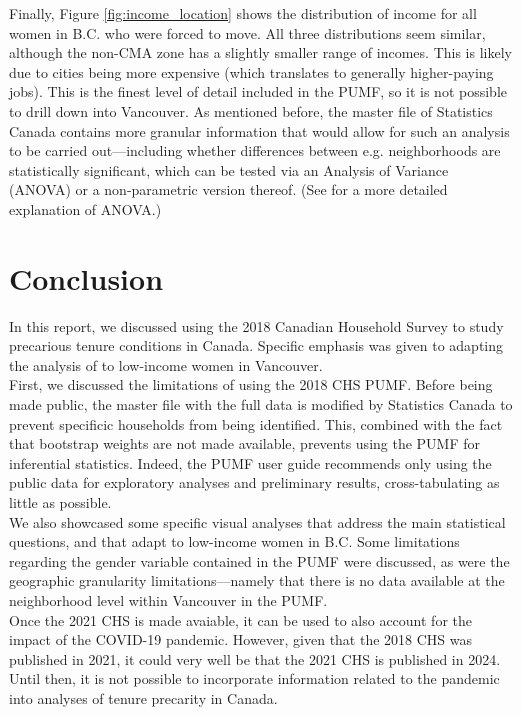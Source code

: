 \documentclass[11pt]{article}
\begin{document}
Finally, Figure \ref{fig:income_location} shows the distribution of income
for all women in B.C. who were forced to move. All three distributions seem
similar, although the non-CMA zone has a slightly smaller range of incomes.
This is likely due to cities being more expensive (which translates to
generally higher-paying jobs). This is the finest level of detail included
in the PUMF, so it is not possible to drill down into Vancouver. As mentioned
before, the master file of Statistics Canada contains more granular information
that would allow for such an analysis to be carried out---including whether
differences between e.g. neighborhoods are statistically significant, which
can be tested via an Analysis of Variance (ANOVA) or a non-parametric
version thereof.
(See \cite[Ch.~14]{agresti} for a more detailed explanation of ANOVA.)



\section{Conclusion} \label{sec:conclusion}


In this report, we discussed using the 2018 Canadian Household Survey
to study precarious tenure conditions in Canada. Specific emphasis
was given to adapting the analysis of \cite{blog} to low-income women
in Vancouver.
\\

First, we discussed the limitations of using the 2018 CHS PUMF.
Before being made public, the master file with the full data
is modified by Statistics Canada to prevent specificic households
from being identified.
This, combined with the fact that bootstrap weights are not made
available, prevents using the PUMF for inferential statistics.
Indeed, the PUMF user guide recommends only using the public data
for exploratory analyses and preliminary results, cross-tabulating
as little as possible.
\\

We also showcased some specific visual analyses that address the main
statistical questions, and that adapt \cite{blog} to low-income women
in B.C. Some limitations regarding the gender variable contained in the
PUMF were discussed, as were the geographic granularity limitations---namely
that there is no data available at the neighborhood level within Vancouver in
the PUMF.
\\

Once the 2021 CHS is made avaiable, it can be used to also account for
the impact of the COVID-19 pandemic. However, given that the 2018 CHS
was published in 2021, it could very well be that the 2021 CHS is
published in 2024. Until then, it is not possible to incorporate information
related to the pandemic into analyses of tenure precarity in Canada.


\clearpage


\end{document}

